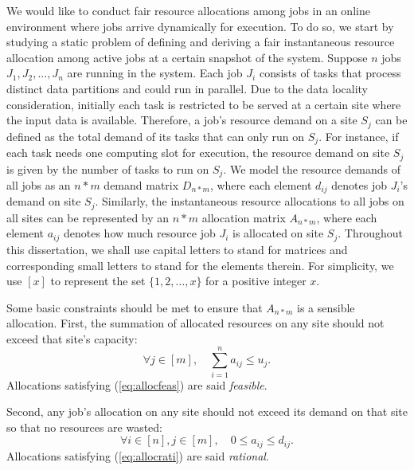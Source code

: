 We would like to conduct fair resource allocations among jobs in an online environment where jobs arrive dynamically for execution. To do so, we start by studying a static problem of defining and deriving a fair instantaneous resource allocation among active jobs at a certain snapshot of the system. Suppose $n$ jobs $J_1, J_2, ..., J_n$ are running in the system. Each job $J_i$ consists of tasks that process distinct data partitions and could run in parallel. Due to the data locality consideration, initially each task is restricted to be served at a certain site where the input data is available. Therefore, a job's resource demand on a site $S_j$ can be defined as the total demand of its tasks that can only run on $S_j$. For instance, if each task needs one computing slot for execution, the resource demand on site $S_j$ is given by the number of tasks to run on $S_j$. We model the resource demands of all jobs as an $n*m$ demand matrix $D_{n*m}$, where each element $d_{ij}$ denotes job $J_i$'s demand on site $S_j$. Similarly, the instantaneous resource allocations to all jobs on all sites can be represented by an $n*m$ allocation matrix $A_{n*m}$, where each element $a_{ij}$ denotes how much resource job $J_i$ is allocated on site $S_j$. Throughout this dissertation, we shall use capital letters to stand for matrices and corresponding small letters to stand for the elements therein. For simplicity, we use $[x]$ to represent the set $\{1, 2, \dots, x\}$ for a positive integer $x$. 

Some basic constraints should be met to ensure that $A_{n*m}$ is a sensible allocation. First, the summation of allocated resources on any site should not exceed that site's capacity:
\begin{equation}
    \forall j\in [m], \quad \sum_{i=1}^n a_{ij} \leq u_j.
\label{eq:allocfeas}
\end{equation}
Allocations satisfying (\ref{eq:allocfeas}) are said {\em feasible}. 

Second, any job's allocation on any site should not exceed its demand on that site so that no resources are wasted:
\begin{equation}
    \forall i\in[n], j\in[m], \quad 0\leq a_{ij}\leq d_{ij}.
\label{eq:allocrati}
\end{equation}
Allocations satisfying (\ref{eq:allocrati}) are said {\em rational}. 


